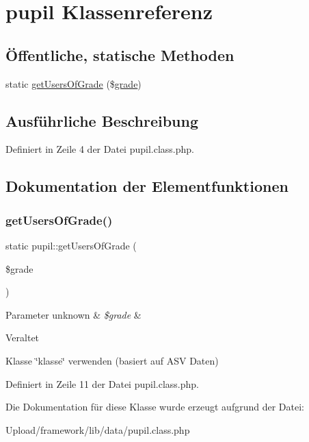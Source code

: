 \hypertarget{classpupil}{}\section{pupil Klassenreferenz}
\label{classpupil}
\subsection*{Öffentliche, statische Methoden}
\begin{DoxyCompactItemize}
\item 
static \mbox{\hyperlink{classpupil_a6d1d7427110a0af2dcb9c5c7ea6db740}{get\+Users\+Of\+Grade}} (\$\mbox{\hyperlink{classgrade}{grade}})
\end{DoxyCompactItemize}


\subsection{Ausführliche Beschreibung}


Definiert in Zeile 4 der Datei pupil.\+class.\+php.



\subsection{Dokumentation der Elementfunktionen}
\mbox{\label{classpupil_a6d1d7427110a0af2dcb9c5c7ea6db740}} 
\subsubsection{\texorpdfstring{get\+Users\+Of\+Grade()}{getUsersOfGrade()}}
{\footnotesize\ttfamily static pupil\+::get\+Users\+Of\+Grade (\begin{DoxyParamCaption}\item[{}]{\$grade }\end{DoxyParamCaption})\hspace{0.3cm}{\ttfamily [static]}}


\begin{DoxyParams}[1]{Parameter}
unknown & {\em \$grade} & \\
\hline
\end{DoxyParams}
\begin{DoxyRefDesc}{Veraltet}
\item[\mbox{\hyperlink{deprecated__deprecated000015}{Veraltet}}]Klasse \char`\"{}klasse\char`\"{} verwenden (basiert auf A\+SV Daten) \end{DoxyRefDesc}


Definiert in Zeile 11 der Datei pupil.\+class.\+php.



Die Dokumentation für diese Klasse wurde erzeugt aufgrund der Datei\+:\begin{DoxyCompactItemize}
\item 
Upload/framework/lib/data/pupil.\+class.\+php\end{DoxyCompactItemize}
